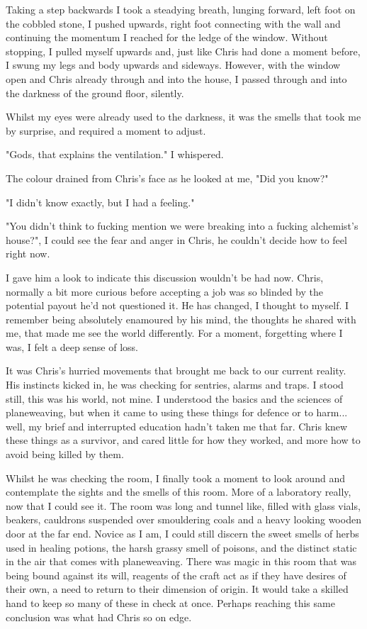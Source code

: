 Taking a step backwards I took a steadying breath, lunging forward, left foot on
the cobbled stone, I pushed upwards, right foot connecting with the wall and
continuing the momentum I reached for the ledge of the window. Without stopping,
I pulled myself upwards and, just like Chris had done a moment before, I swung my
legs and body upwards and sideways. However, with the window open and Chris
already through and into the house, I passed through and into the darkness of
the ground floor, silently.


Whilst my eyes were already used to the darkness, it was the smells that
took me by surprise, and required a moment to adjust.  

\begin{dialogue}
    \item{"Gods, that explains the ventilation." I whispered.}
    \item{The colour drained from Chris's face as he looked at me, "Did you know?"}
    \item{"I didn't know exactly, but I had a feeling."}
    \item{"You didn't think to fucking mention we were breaking into a fucking alchemist's house?", I could see the fear and anger in Chris, he couldn't decide how to feel right now.}
\end{dialogue}

I gave him a look to indicate this discussion wouldn't be had now. Chris,
normally a bit more curious before accepting a job was so blinded by the
potential payout he'd not questioned it. He has changed, I thought to myself. I
remember being absolutely enamoured by his mind, the thoughts he shared with me,
that made me see the world differently. For a moment, forgetting where I was, I
felt a deep sense of loss. 

It was Chris's hurried movements that brought me back to our current reality.
His instincts kicked in, he was checking for sentries, alarms and traps. I stood
still, this was his world, not mine. I understood the basics and the sciences of
planeweaving, but when it came to using these things for defence or to harm...
well, my brief and interrupted education hadn't taken me that far. Chris knew
these things as a survivor, and cared little for how they worked, and more how
to avoid being killed by them.

Whilst he was checking the room, I finally took a moment to look around and
contemplate the sights and the smells of this room. More of a laboratory really,
now that I could see it. The room was long and tunnel like, filled with glass vials, beakers,
cauldrons suspended over smouldering coals and a heavy looking wooden door at
the far end. Novice as I am, I could still
discern the sweet smells of herbs used in healing potions, the harsh grassy
smell of poisons, and the distinct static in the air that comes with
planeweaving. There was magic in this room that was being bound against its
will, reagents of the craft act as if they have desires of their own, a need to
return to their dimension of origin. It would take a skilled hand to keep so
many of these in check at once. Perhaps reaching this same conclusion was what
had Chris so on edge.

